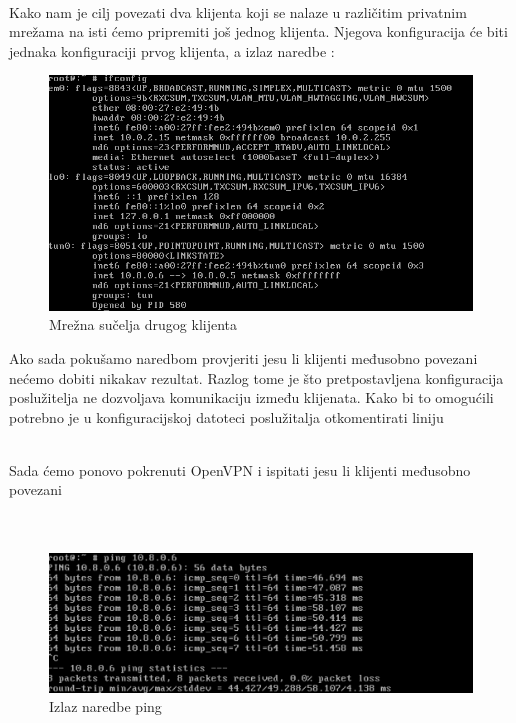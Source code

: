        \noindent
         \\

        Kako nam je cilj povezati dva klijenta koji se nalaze u različitim
        privatnim mrežama na isti ćemo pripremiti još jednog klijenta. Njegova
        konfiguracija će biti jednaka konfiguraciji prvog klijenta, a izlaz
        naredbe :
        \begin{figure}[H]
            \centering
            \includegraphics[scale=0.45]{slike/client2Ifconfig}
            \caption{Mrežna sučelja drugog klijenta}
        \end{figure}

        \noindent
        Ako sada pokušamo naredbom
        provjeriti jesu li klijenti međusobno povezani nećemo dobiti nikakav
        rezultat. Razlog tome je što pretpostavljena konfiguracija poslužitelja
        ne dozvoljava komunikaciju između klijenata. Kako bi to omogućili
        potrebno je u konfiguracijskoj datoteci poslužitalja otkomentirati liniju 

        \noindent 
         \\

        \noindent
        Sada ćemo ponovo pokrenuti OpenVPN i ispitati jesu li klijenti
        međusobno povezani \\

        \noindent
         \\
         \\
        \begin{figure}[H]
            \centering
            \includegraphics[scale=0.5]{slike/pingResult}
            \caption{Izlaz naredbe ping}
        \end{figure}

